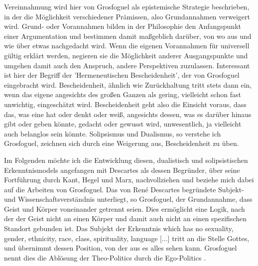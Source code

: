 Vereinnahmung wird hier von Grosfoguel als epistemische Strategie beschrieben,
in der die Möglichkeit verschiedener Prämissen, also Grundannahmen verweigert
wird. Grund- oder Vorannahmen bilden in der Philosophie den Anfangspunkt einer
Argumentation und bestimmen damit maßgeblich darüber, von wo aus und wie über
etwas nachgedacht wird. Wenn die eigenen Vorannahmen für universell gültig
erklärt werden, negieren sie die Möglichkeit anderer Ausgangspunkte und umgehen
damit auch den Anspruch, andere Perspektiven zuzulassen. Interessant ist hier
der Begriff der 'Hermeneutischen Bescheidenheit', der von Grosfoguel
eingebracht wird. Bescheidenheit, ähnlich wie Zurückhaltung tritt stets dann
ein, wenn das eigene angesichts des großen Ganzen als gering, vielleicht schon
fast unwichtig, eingeschätzt wird. Bescheidenheit geht also die Einsicht
voraus, dass das, was eine hat oder denkt oder weiß, angesichts dessen, was es
darüber hinaus gibt oder geben könnte, gedacht oder gewusst wird, unwesentlich,
ja vielleicht auch belanglos sein könnte. Solipsismus und Dualismus, so
verstehe ich Grosfoguel, zeichnen sich durch eine Weigerung aus, Bescheidenheit
zu üben. 

Im Folgenden möchte ich die Entwicklung diesen, dualistisch und solipsistischen
Erkenntnismodels angefangen mit Descartes als dessen Begründer, über seine
Fortführung durch Kant, Hegel und Marx, nachvollziehen und beziehe mich dabei
auf die Arbeiten von Grosfoguel.  Das von René Descartes begründete Subjekt-
und Wissenschaftsverständnis unterliegt, so Grosfoguel, der Grundannahme, dass
Geist und Körper voneinander getrennt seien. Dies ermöglicht eine Logik, nach
der der Geist nicht an einen Körper und damit auch nicht an einen spezifischen
Standort gebunden ist. \footnotemark {}
Das Subjekt der Erkenntnis  \glqq [...]which has no
sexuality, gender, ethnicity, race, class, spirituality, language [...] \grqq
\footnotemark {} tritt an die Stelle
Gottes, und übernimmt dessen Position, von der aus es alles sehen kann.
Grosfoguel nennt dies die Ablösung der  \glqq Theo-Politics \grqq \footnotemark
{} durch die
\glqq Ego-Politics \grqq. \footnotemark {}

